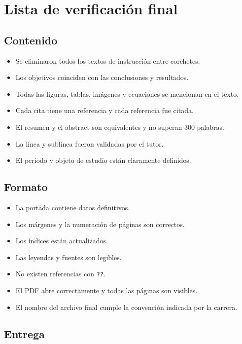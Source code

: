 \documentclass[12pt,a4paper,oneside]{report}
\begin{document}
\chapter{Lista de verificación final}

\section{Contenido}

\begin{itemize}
  \item[$\square$] Se eliminaron todos los textos de instrucción entre corchetes.
  \item[$\square$] Los objetivos coinciden con las conclusiones y resultados.
  \item[$\square$] Todas las figuras, tablas, imágenes y ecuaciones se mencionan en el texto.
  \item[$\square$] Cada cita tiene una referencia y cada referencia fue citada.
  \item[$\square$] El resumen y el abstract son equivalentes y no superan 300 palabras.
  \item[$\square$] La línea y sublínea fueron validadas por el tutor.
  \item[$\square$] El periodo y objeto de estudio están claramente definidos.
\end{itemize}

\section{Formato}

\begin{itemize}
  \item[$\square$] La portada contiene datos definitivos.
  \item[$\square$] Los márgenes y la numeración de páginas son correctos.
  \item[$\square$] Los índices están actualizados.
  \item[$\square$] Las leyendas y fuentes son legibles.
  \item[$\square$] No existen referencias con \texttt{??}.
  \item[$\square$] El PDF abre correctamente y todas las páginas son visibles.
  \item[$\square$] El nombre del archivo final cumple la convención indicada por la carrera.
\end{itemize}

\section{Entrega}
\end{document}
